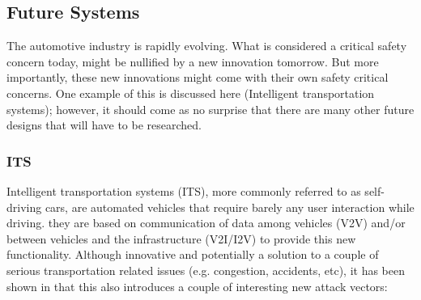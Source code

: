 \subsection{Future Systems}
\label{subsec:future_systems}

The automotive industry is rapidly evolving. What is considered a critical safety concern today, might be nullified by a new innovation tomorrow. But more importantly, these new innovations might come with their own safety critical concerns. One example of this is discussed here (Intelligent transportation systems); however, it should come as no surprise that there are many other future designs that will have to be researched.

\subsubsection{ITS} 
\label{subsubsec:its}

Intelligent transportation systems (ITS), more commonly referred to as self-driving cars, are automated vehicles that require barely any user interaction while driving. they are based on communication of data among vehicles (V2V) and/or between vehicles and the infrastructure (V2I/I2V) to provide this new functionality. Although innovative and potentially a solution to a couple of serious transportation related issues (e.g. congestion, accidents, etc), it has been shown in \cite{Petit} that this also introduces a couple of interesting new attack vectors:   

